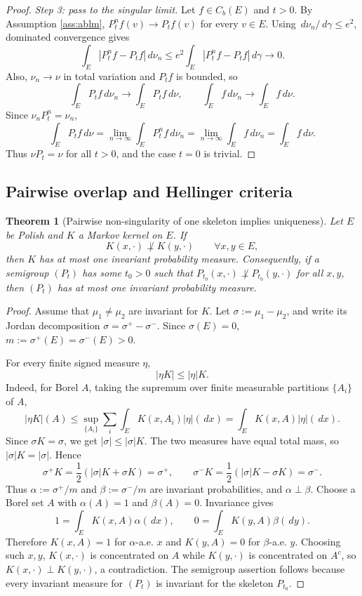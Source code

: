 \documentclass[12pt]{article}
\newcommand{\1}{\mathbf 1}
\newcommand{\dd}{\,d}
\theoremstyle{plain}
\newtheorem{theorem}{Theorem}[section]
\theoremstyle{definition}
\theoremstyle{remark}
\numberwithin{equation}{section}
\begin{document}
\begin{proof}
\emph{Step 3: pass to the singular limit.}
Let \(f\in C_b(E)\) and \(t>0\).  By Assumption \ref{ass:ablm},
\(P_t^nf(v)\to P_tf(v)\) for every \(v\in E\).  Using
\(\dd\nu_n/\dd\gamma\le e^2\), dominated convergence gives
\[
\int_E|P_t^nf-P_tf|\dd\nu_n
\le
e^2\int_E|P_t^nf-P_tf|\dd\gamma
\longrightarrow0.
\]
Also, \(\nu_n\to\nu\) in total variation and \(P_tf\) is bounded, so
\[
\int_EP_tf\dd\nu_n\longrightarrow\int_EP_tf\dd\nu,
\qquad
\int_Ef\dd\nu_n\longrightarrow\int_Ef\dd\nu.
\]
Since \(\nu_nP_t^n=\nu_n\),
\[
\int_EP_tf\dd\nu
=
\lim_{n\to\infty}\int_EP_t^nf\dd\nu_n
=
\lim_{n\to\infty}\int_Ef\dd\nu_n
=
\int_Ef\dd\nu.
\]
Thus \(\nu P_t=\nu\) for all \(t>0\), and the case \(t=0\) is trivial.
\end{proof}

\subsection{Pairwise overlap and Hellinger criteria}

\begin{theorem}[Pairwise non-singularity of one skeleton implies uniqueness]\label{thm:pairwise}
Let \(E\) be Polish and \(K\) a Markov kernel on \(E\).  If
\[
K(x,\cdot)\not\perp K(y,\cdot)\qquad\forall x,y\in E,
\]
then \(K\) has at most one invariant probability measure.  Consequently, if a
semigroup \((P_t)\) has some \(t_0>0\) such that
\(P_{t_0}(x,\cdot)\not\perp P_{t_0}(y,\cdot)\) for all \(x,y\), then
\((P_t)\) has at most one invariant probability measure.
\end{theorem}

\begin{proof}
Assume that \(\mu_1\ne\mu_2\) are invariant for \(K\).  Let
\(\sigma:=\mu_1-\mu_2\), and write its Jordan decomposition
\(\sigma=\sigma^+-\sigma^-\).  Since \(\sigma(E)=0\),
\(m:=\sigma^+(E)=\sigma^-(E)>0\).

For every finite signed measure \(\eta\),
\[
|\eta K|\le |\eta|K.
\]
Indeed, for Borel \(A\), taking the supremum over finite measurable partitions
\(\{A_i\}\) of \(A\),
\[
|\eta K|(A)
\le
\sup_{\{A_i\}}\sum_i\int_EK(x,A_i)|\eta|(\dd x)
=
\int_EK(x,A)|\eta|(\dd x).
\]
Since \(\sigma K=\sigma\), we get \(|\sigma|\le|\sigma|K\).  The two measures
have equal total mass, so \(|\sigma|K=|\sigma|\).  Hence
\[
\sigma^+K=\frac12(|\sigma|K+\sigma K)=\sigma^+,
\qquad
\sigma^-K=\frac12(|\sigma|K-\sigma K)=\sigma^-.
\]
Thus \(\alpha:=\sigma^+/m\) and \(\beta:=\sigma^-/m\) are invariant
probabilities, and \(\alpha\perp\beta\).  Choose a Borel set \(A\) with
\(\alpha(A)=1\) and \(\beta(A)=0\).  Invariance gives
\[
1=\int_EK(x,A)\alpha(\dd x),\qquad
0=\int_EK(y,A)\beta(\dd y).
\]
Therefore \(K(x,A)=1\) for \(\alpha\)-a.e. \(x\) and \(K(y,A)=0\) for
\(\beta\)-a.e. \(y\).  Choosing such \(x,y\), \(K(x,\cdot)\) is concentrated on
\(A\) while \(K(y,\cdot)\) is concentrated on \(A^c\), so
\(K(x,\cdot)\perp K(y,\cdot)\), a contradiction.  The semigroup assertion
follows because every invariant measure for \((P_t)\) is invariant for the
skeleton \(P_{t_0}\).
\end{proof}
\end{document}
